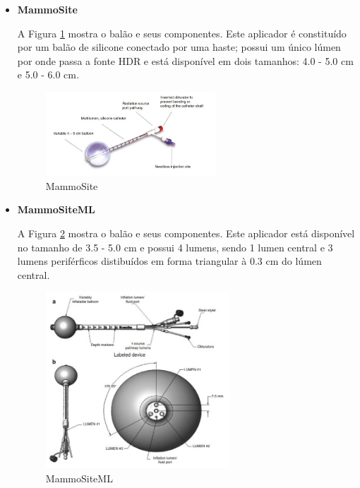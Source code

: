 \documentclass[11pt,a4paper]{article}
\begin{document}
			\begin{itemize}
				\item \textbf{\textcolor{CarnationPink}{MammoSite}}
				
					A Figura \ref{img:mammosite} mostra o balão e seus componentes. Este aplicador é constituído por um balão de silicone conectado por uma haste; possui um único lúmen por onde passa a fonte HDR e está disponível em dois tamanhos: 4.0 - 5.0 cm e 5.0 - 6.0 cm.

					\begin{figure}[h]
						\centering
						\includegraphics[width=0.6\textwidth]{Imagens/balaoMammoSite.JPG}
						\caption{MammoSite}
						\label{img:mammosite}
					\end{figure}

				\item \textbf{\textcolor{CarnationPink}{MammoSiteML}}
				
					A Figura \ref{img:mammositeml} mostra o balão e seus componentes. Este aplicador está disponível no tamanho de 3.5 - 5.0 cm e possui 4 lumens, sendo 1 lumen central e 3 lumens periférficos distibuídos em forma triangular à 0.3 cm do lúmen central.

					\begin{figure}[h]
						\centering
						\includegraphics[width=0.65\textwidth]{Imagens/mammositeML.JPG}
						\caption{MammoSiteML}
						\label{img:mammositeml}
					\end{figure}


\end{itemize}
\end{document}
